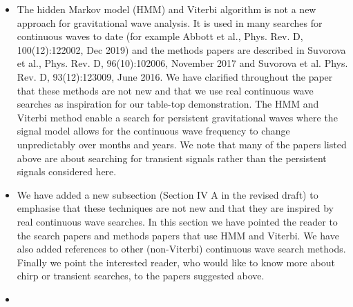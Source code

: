 \documentclass{article}
\newcommand{\todo}{\textcolor{blue}}
\newcommand{\han}{\textcolor{orange}}
\begin{document}
\begin{itemize}
\item The hidden Markov model (HMM) and Viterbi algorithm is not a new approach for gravitational wave analysis. It is used in many searches for continuous waves to date (for example Abbott et al., Phys. Rev. D, 100(12):122002, Dec 2019) and the methods papers are described in Suvorova et al., Phys. Rev. D, 96(10):102006, November 2017 and Suvorova et al. Phys. Rev. D, 93(12):123009, June 2016. We have clarified throughout the paper that these methods are not new and that we use real continuous wave searches as inspiration for our table-top demonstration. The HMM and Viterbi method enable a search for persistent gravitational waves where the signal model allows for the continuous wave frequency to change unpredictably over months and years. We note that many of the papers listed above are about searching for transient signals rather than the persistent signals considered here. 
\item We have added a new subsection (Section IV A in the revised draft) to emphasise that these techniques are not new and that they are inspired by real continuous wave searches. In this section we have pointed the reader to the search papers and methods papers that use HMM and Viterbi. We have also added references to other (non-Viterbi) continuous wave search methods. Finally we point the interested reader, who would like to know more about chirp or transient searches, to the papers suggested above. 
\item[]
\end{itemize}
\end{document}

